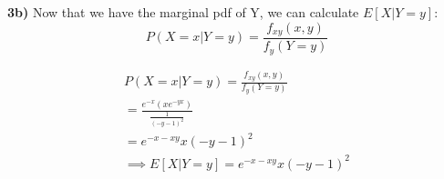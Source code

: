 \textbf{3b)} Now that we have the marginal pdf of Y, we can calculate $E[X | Y = y]$: \\
$$P(X = x | Y = y)  = \frac{f_{xy}(x,y)}{f_{y}(Y = y)}$$

\begin{equation}
    \begin{split}
        P(X = x | Y = y)  = \frac{f_{xy}(x,y)}{f_{y}(Y = y)}\\
        = \frac{e^{-x} \left(xe^{-yx}\right)}{\frac{1}{\left(-y-1\right)^2}} \\
        = e^{-x-xy}x\left(-y-1\right)^2 \\
        \implies E[X | Y = y] = e^{-x-xy}x\left(-y-1\right)^2
    \end{split}
\end{equation}





